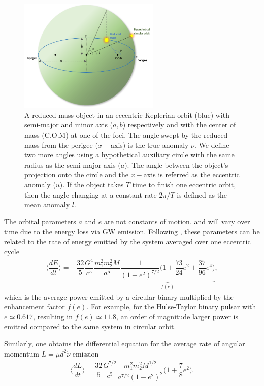\begin{figure}
    \centering
    \includegraphics[width=0.6\textwidth]{figures/Introduction/ecc-angles.png}
    \caption{A reduced mass object in an eccentric Keplerian orbit (blue) with semi-major and minor axis ($a,b$) respectively and with the center of mass (C.O.M) at one of the foci. The angle swept by the reduced mass from the perigee ($x-$axis) is the true anomaly $\nu$. We define two more angles using a hypothetical auxiliary circle with the same radius as the semi-major axis ($a$). The angle between the object's projection onto the circle and the $x-$axis is referred as the eccentric anomaly ($u$). If the object takes $T$ time to finish one eccentric orbit, then the angle changing at a constant rate $2\pi/T$ is defined as the mean anomaly $l$.}
    \label{fig:ecc-angles}
\end{figure}


The orbital parameters $a$ and $e$ are not constants of motion, and will vary over time due to the energy loss via GW emission. Following \cite{Peters:1963ux}, these parameters can be related to the rate of energy emitted by the system averaged over one eccentric cycle  
\begin{align}
    \langle \dfrac{dE}{dt} \rangle = -\dfrac{32}{5}\dfrac{G^4}{c^5}\dfrac{m_1^2m_2^2M}{a^5}\underbrace{\dfrac{1}{(1-e^2)^{7/2}}\Bigg(1 + \dfrac{73}{24}e^2 + \dfrac{37}{96}e^4 \Bigg)}_{f(e)},
    \label{Eq:energy-evol}
\end{align}
which is the average power emitted by a circular binary multiplied by the enhancement factor  $f(e)$. For example, for the Hulse-Taylor binary pulsar with $e \simeq 0.617$, resulting in $f(e) \simeq 11.8$, an order of magnitude larger power is emitted compared to the same system in circular orbit.

Similarly, one obtains the differential equation for the average rate of angular momentum $L = \mu d^2\dot{\nu}$ emission
\begin{align}
    \langle \dfrac{dL}{dt} \rangle = \dfrac{32}{5}\dfrac{G^{7/2}}{c^5}\dfrac{m_1^2m_2^2M^{1/2}}{a^{7/2}(1-e^2)^{2}}\Bigg(1 + \dfrac{7}{8}e^2 \Bigg).
    \label{Eq:angmomentum-evol}
\end{align}

